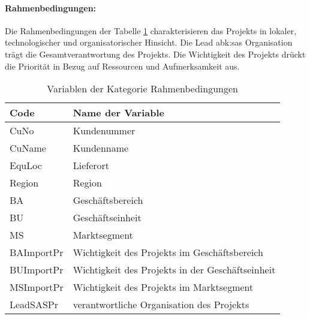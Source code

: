 \paragraph{Rahmenbedingungen:} Die Rahmenbedingungen der Tabelle \ref{tab:rahm} charakterisieren das Projekts in lokaler, technologischer und organisatorischer Hinsicht. Die Lead \gls{abk:sas} Organisation trägt die Gesamtverantwortung des Projekts. Die Wichtigkeit des Projekts drückt die Priorität in Bezug auf Ressourcen und Aufmerksamkeit aus.
\begin{table}[htbp]
	\centering
	\caption{Variablen der Kategorie Rahmenbedingungen}
	\begin{tabular}{ll}
		\toprule
		\textbf{Code} & \textbf{Name der Variable} \\
		\midrule
		CuNo  & Kundenummer \\
		CuName & Kundenname \\
		EquLoc & Lieferort \\
		Region & Region \\
		BA    & Geschäftsbereich \\
		BU    & Geschäftseinheit \\
		MS    & Marktsegment \\
		BAImportPr & Wichtigkeit des Projekts im Geschäftsbereich \\
		BUImportPr & Wichtigkeit des Projekts in der Geschäftseinheit \\
		MSImportPr & Wichtigkeit des Projekts im Marktsegment \\
		LeadSASPr & verantwortliche Organisation des Projekts\\
		\bottomrule
	\end{tabular}%
	\label{tab:rahm}%
\end{table}%
